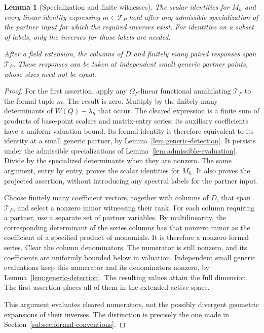 \documentclass[11pt]{article}
\newtheorem{lemma}[theorem]{Lemma}
\theoremstyle{definition}
\theoremstyle{remark}
\numberwithin{equation}{section}
\begin{document}
\begin{lemma}[Specialization and finite witnesses]
\label{lem:active-specialization}
The scalar identities for $M_h$ and every linear identity expressing
$m\in\mathcal T_P$ hold after any admissible specialization of the
partner input for which the required inverses exist.  For identities
on a subset of labels, only the inverses for those labels are needed.

After a field extension, the columns of $D$ and finitely many paired
responses span $\mathcal T_P$.  These responses can be taken at
independent small generic partner points, whose sizes need not be
equal.
\end{lemma}

\begin{proof}
For the first assertion, apply any $\Omega_P$-linear functional
annihilating $\mathcal T_P$ to the formal tuple $m$.  The result is
zero.  Multiply by the finitely many determinants of
$W(Q)-\lambda_h$ that occur.  The cleared expression is a finite
sum of products of base-point scalars and matrix-entry series; its
auxiliary coefficients have a uniform valuation bound.  Its formal
identity is therefore equivalent to its identity at a small generic
partner, by Lemma~\ref{lem:generic-detection}.  It persists under the
admissible specializations of Lemma~\ref{lem:admissible-evaluation}.
Divide by the specialized determinants when they are nonzero.  The
same argument, entry by entry, proves the scalar identities for
$M_h$.  It also proves the projected assertion, without introducing
any spectral labels for the partner input.

Choose finitely many coefficient vectors, together with columns of
$D$, that span $\mathcal T_P$, and select a nonzero minor witnessing
their rank.  For each column requiring a partner, use a separate set
of partner variables.  By multilinearity, the corresponding
determinant of the series columns has that nonzero minor as the
coefficient of a specified product of monomials.  It is therefore a
nonzero formal series.  Clear the column denominators.  The numerator
is still nonzero, and its coefficients are uniformly bounded below
in valuation.  Independent small generic evaluations keep this
numerator and its denominators nonzero, by
Lemma~\ref{lem:generic-detection}.  The resulting values attain the
full dimension.  The first assertion places all of them in the
extended active space.

This argument evaluates cleared numerators, not the possibly
divergent geometric expansions of their inverses.  The distinction
is precisely the one made in Section~\ref{subsec:formal-conventions}.
\end{proof}
\end{document}
